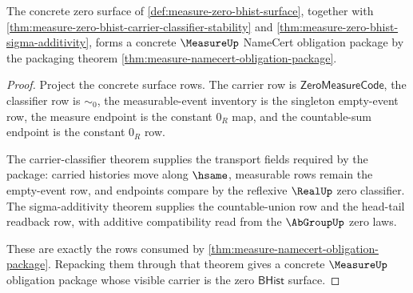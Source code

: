 \begin{theorem}
\label{thm:measure-zero-bhist-namecert-package}
The concrete zero surface of
\autoref{def:measure-zero-bhist-surface}, together with
\autoref{thm:measure-zero-bhist-carrier-classifier-stability} and
\autoref{thm:measure-zero-bhist-sigma-additivity}, forms a concrete
$\MeasureUp$ NameCert obligation package by the packaging theorem
\autoref{thm:measure-namecert-obligation-package}.
\end{theorem}
\begin{proof}
Project the concrete surface rows. The carrier row is
$\mathsf{ZeroMeasureCode}$, the classifier row is $\sim_0$, the measurable-event
inventory is the singleton empty-event row, the measure endpoint is the constant
$0_R$ map, and the countable-sum endpoint is the constant $0_R$ row.

The carrier-classifier theorem supplies the transport fields required by the
package: carried histories move along $\hsame$, measurable rows remain the
empty-event row, and endpoints compare by the reflexive $\RealUp$ zero
classifier. The sigma-additivity theorem supplies the countable-union row and
the head-tail readback row, with additive compatibility read from the
$\AbGroupUp$ zero laws.

These are exactly the rows consumed by
\autoref{thm:measure-namecert-obligation-package}. Repacking them through that
theorem gives a concrete $\MeasureUp$ obligation package whose visible carrier
is the zero $\mathsf{BHist}$ surface.
\end{proof}

